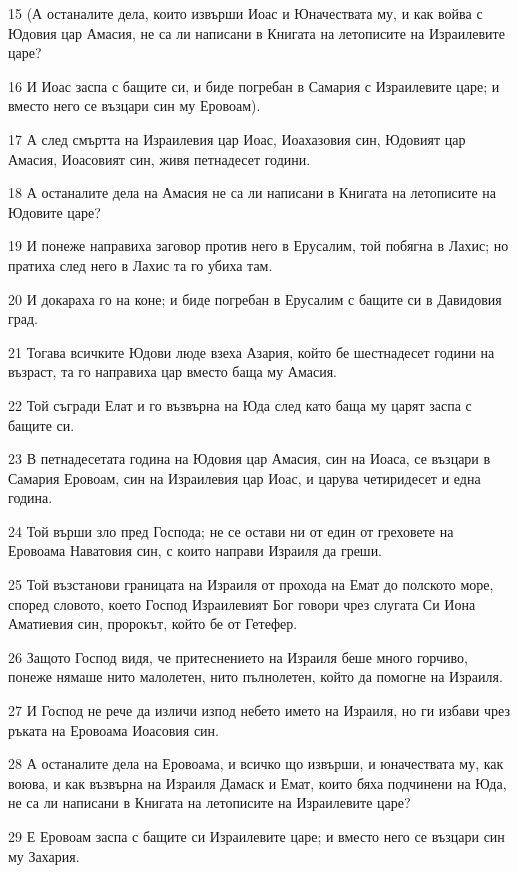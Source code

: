 \par 15 (А останалите дела, които извърши Иоас и Юначествата му, и как войва с Юдовия цар Амасия, не са ли написани в Книгата на летописите на Израилевите царе?
\par 16 И Иоас заспа с бащите си, и биде погребан в Самария с Израилевите царе; и вместо него се възцари син му Еровоам).
\par 17 А след смъртта на Израилевия цар Иоас, Иоахазовия син, Юдовият цар Амасия, Иоасовият син, живя петнадесет години.
\par 18 А останалите дела на Амасия не са ли написани в Книгата на летописите на Юдовите царе?
\par 19 И понеже направиха заговор против него в Ерусалим, той побягна в Лахис; но пратиха след него в Лахис та го убиха там.
\par 20 И докараха го на коне; и биде погребан в Ерусалим с бащите си в Давидовия град.
\par 21 Тогава всичките Юдови люде взеха Азария, който бе шестнадесет години на възраст, та го направиха цар вместо баща му Амасия.
\par 22 Той съгради Елат и го възвърна на Юда след като баща му царят заспа с бащите си.
\par 23 В петнадесетата година на Юдовия цар Амасия, син на Иоаса, се възцари в Самария Еровоам, син на Израилевия цар Иоас, и царува четиридесет и една година.
\par 24 Той върши зло пред Господа; не се остави ни от един от греховете на Еровоама Наватовия син, с които направи Израиля да греши.
\par 25 Той възстанови границата на Израиля от прохода на Емат до полското море, според словото, което Господ Израилевият Бог говори чрез слугата Си Иона Аматиевия син, пророкът, който бе от Гетефер.
\par 26 Защото Господ видя, че притеснението на Израиля беше много горчиво, понеже нямаше нито малолетен, нито пълнолетен, който да помогне на Израиля.
\par 27 И Господ не рече да изличи изпод небето името на Израиля, но ги избави чрез ръката на Еровоама Иоасовия син.
\par 28 А останалите дела на Еровоама, и всичко що извърши, и юначествата му, как воюва, и как възвърна на Израиля Дамаск и Емат, които бяха подчинени на Юда, не са ли написани в Книгата на летописите на Израилевите царе?
\par 29 Е Еровоам заспа с бащите си Израилевите царе; и вместо него се възцари син му Захария.

